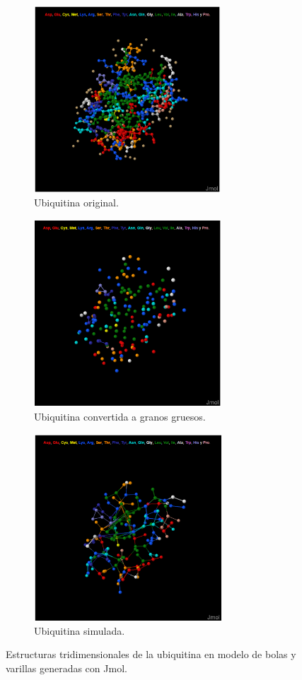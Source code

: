 \documentclass[3pt,twocolumn]{elsarticle}
\begin{document}
\begin{figure}
\begin{subfigure}{0.49\textwidth}
\centering
\includegraphics[height=7cm,width=\linewidth]{pPDB.png}
\caption{Ubiquitina original.}
\label{1}
\end{subfigure}\hfill
\begin{subfigure}{0.49\textwidth}
\centering
\includegraphics[height=7cm,width=\linewidth]{pCG.png}
\caption{Ubiquitina convertida a granos gruesos.}
\label{2}
\end{subfigure}\hfill
\begin{subfigure}{0.49\textwidth}
\includegraphics[height=7cm,width=\linewidth]{pMD.png}
\caption{Ubiquitina simulada.}
\label{3}
\end{subfigure}\hfill
\caption{Estructuras tridimensionales de la ubiquitina en modelo de bolas y varillas generadas con Jmol.}
\label{estructura}
\end{figure}
\end{document}
